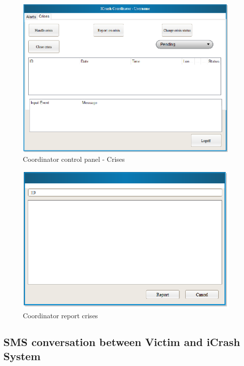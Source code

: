 \begin{figure}
  \centering
    \includegraphics[scale=0.75]{images/mockups/other/CoordinatorControlPanelCrises.eps}
  \caption{Coordinator control panel - Crises}
  \label{fig:CoordinatorControlPanelCrises}
\end{figure}


\begin{figure}
  \centering
    \includegraphics[scale=0.75]{images/mockups/other/ReportCrises.eps}
  \caption{Coordinator report crises}
  \label{fig:CoordinatorReportCrises}
\end{figure}


\subsection{SMS conversation between Victim and iCrash System}

